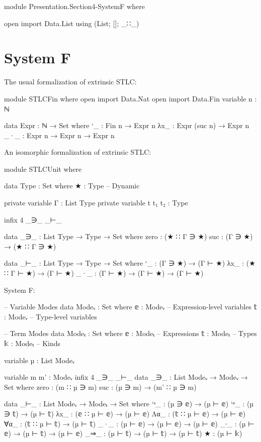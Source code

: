 \begin{code}[hide]
module Presentation.Section4-SystemF where

open import Data.List using (List; []; _∷_)
\end{code}

\newpage
\section{System F}

The usual formalization of extrinsic STLC:
\begin{code}[hide]
module STLCFin where
  open import Data.Nat
  open import Data.Fin
  variable n : ℕ
\end{code}
\begin{code}
  data Expr : ℕ → Set where
    `_   : Fin n → Expr n
    λx_  : Expr (suc n) → Expr n
    _·_  : Expr n → Expr n → Expr n
\end{code}

An isomorphic formalization of extrinsic STLC:
\begin{code}[hide]
module STLCUnit where
\end{code}
\begin{code}
  data Type : Set where
    ★ : Type -- Dynamic
\end{code}
\begin{code}[hide]
  private variable Γ : List Type
  private variable t t₁ t₂ : Type

  infix  4  _∋_  _⊢_

  data _∋_ : List Type → Type → Set where
    zero  : (★ ∷ Γ ∋ ★)
    suc   : (Γ ∋ ★) → (★ ∷ Γ ∋ ★)
\end{code}
\begin{code}
  data _⊢_ : List Type → Type → Set where
    `_   : (Γ ∋ ★) → (Γ ⊢ ★)
    λx_  : (★ ∷ Γ ⊢ ★) → (Γ ⊢ ★)
    _·_  : (Γ ⊢ ★) → (Γ ⊢ ★) → (Γ ⊢ ★)
\end{code}

System F:

\begin{code}
-- Variable Modes
data Modeᵥ : Set where
  𝕖 : Modeᵥ  -- Expression-level variables
  𝕥 : Modeᵥ  -- Type-level variables

-- Term Modes
data Modeₜ : Set where
  𝕖 : Modeₜ  -- Expressions
  𝕥 : Modeₜ  -- Types
  𝕜 : Modeₜ  -- Kinds

variable µ : List Modeᵥ
\end{code}
\begin{code}[hide]
variable m m' : Modeᵥ
infix  4  _∋_  _⊢_
data _∋_ : List Modeᵥ → Modeᵥ → Set where
  zero  : (m ∷ µ ∋ m)
  suc   : (µ ∋ m) → (m' ∷ µ ∋ m)
\end{code}
\begin{code}
data _⊢_ : List Modeᵥ → Modeₜ → Set where
  `ˣ_   : (µ ∋ 𝕖) → (µ ⊢ 𝕖)
  `ᵅ_   : (µ ∋ 𝕥) → (µ ⊢ 𝕥)
  λx_   : (𝕖 ∷ µ ⊢ 𝕖) → (µ ⊢ 𝕖)
  Λα_   : (𝕥 ∷ µ ⊢ 𝕖) → (µ ⊢ 𝕖)
  ∀α_   : (𝕥 ∷ µ ⊢ 𝕥) → (µ ⊢ 𝕥)
  _·_   : (µ ⊢ 𝕖) → (µ ⊢ 𝕖) → (µ ⊢ 𝕖)
  _∙_   : (µ ⊢ 𝕖) → (µ ⊢ 𝕥) → (µ ⊢ 𝕖)
  _⇒_   : (µ ⊢ 𝕥) → (µ ⊢ 𝕥) → (µ ⊢ 𝕥)
  ★     : (µ ⊢ 𝕜)
\end{code}
